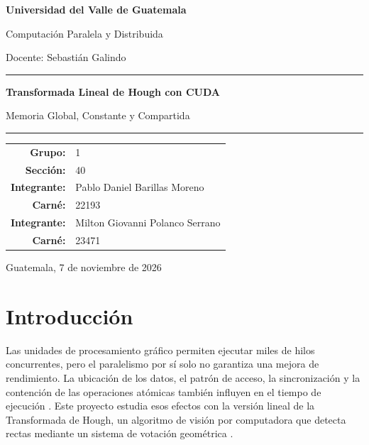 \documentclass[12pt,letterpaper]{article}
\newcommand{\carnePablo}{22193}
\newcommand{\carneMilton}{23471}
\begin{document}

\begin{titlepage}
  \centering
  \vspace*{1.2cm}
  {\Large\bfseries Universidad del Valle de Guatemala\par}
  \vspace{0.4cm}
  {\large Computación Paralela y Distribuida\par}
  {\large Docente: Sebastián Galindo\par}
  \vfill
  {\color{uvgblue}\rule{\textwidth}{1.2pt}\par}
  \vspace{0.7cm}
  {\Huge\bfseries Transformada Lineal de Hough con CUDA\par}
  \vspace{0.35cm}
  {\Large Memoria Global, Constante y Compartida\par}
  \vspace{0.7cm}
  {\color{uvgblue}\rule{\textwidth}{1.2pt}\par}
  \vfill
  \begin{tabular}{rl}
    \textbf{Grupo:} & 1 \\
    \textbf{Sección:} & 40 \\
    \textbf{Integrante:} & Pablo Daniel Barillas Moreno \\
    \textbf{Carné:} & \carnePablo \\
    \textbf{Integrante:} & Milton Giovanni Polanco Serrano \\
    \textbf{Carné:} & \carneMilton \\
  \end{tabular}
  \vfill
  {\large Guatemala, 7 de noviembre de 2026\par}
\end{titlepage}

\tableofcontents
\listoffigures
\listoftables
\clearpage
{}

\section{Introducción}

Las unidades de procesamiento gráfico permiten ejecutar miles de hilos concurrentes, pero el paralelismo por sí solo no garantiza una mejora de rendimiento. La ubicación de los datos, el patrón de acceso, la sincronización y la contención de las operaciones atómicas también influyen en el tiempo de ejecución \cite{cuda-guide}. Este proyecto estudia esos efectos con la versión lineal de la Transformada de Hough, un algoritmo de visión por computadora que detecta rectas mediante un sistema de votación geométrica \cite{duda-hart}.
\end{document}
